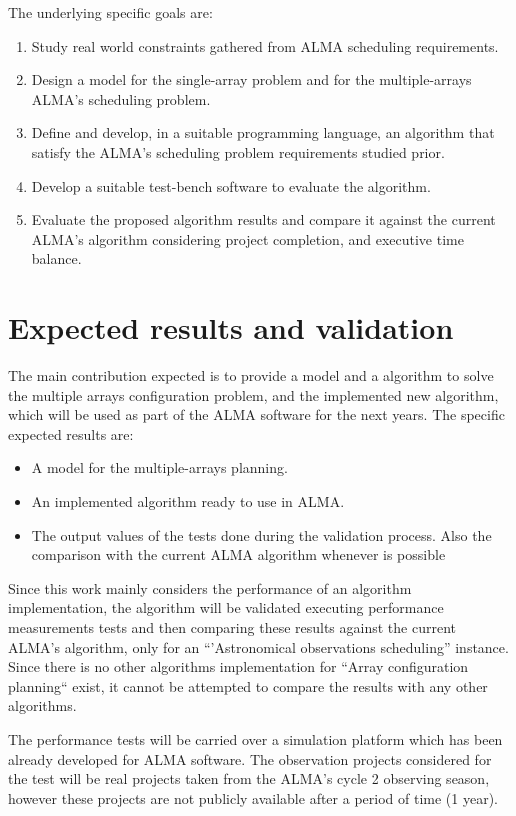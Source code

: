The underlying specific goals are:
\begin{enumerate}
\item Study real world constraints gathered from ALMA scheduling requirements.
\item Design a model for the single-array problem and for the multiple-arrays ALMA’s
scheduling problem.
\item Define and develop, in a suitable programming language, an algorithm that satisfy the ALMA’s scheduling problem requirements
studied prior.
\item Develop a suitable test-bench software to evaluate the algorithm.
\item Evaluate the proposed algorithm results and compare it against the current ALMA's algorithm considering project completion, and executive time balance.
\end{enumerate}

\section{Expected results and validation}
The main contribution expected is to provide a model and a algorithm to solve the multiple arrays configuration problem, and the implemented new algorithm, which will be used as part of the ALMA software for the next years.
The specific expected results are:
\begin{itemize}
\item A model for the multiple-arrays planning.
\item An implemented algorithm ready to use in ALMA.
\item The output values of the tests done during the validation process. Also the comparison with
the current ALMA algorithm whenever is possible
\end{itemize}

Since this work mainly considers the performance of an algorithm implementation, the algorithm will be validated
executing performance measurements tests and then comparing these results against the current ALMA's algorithm, only for an ``'Astronomical observations scheduling'' instance. Since there is no other algorithms implementation for ``Array configuration planning`` exist, it cannot be attempted to compare the results with any other algorithms.

The performance tests will be carried over a simulation platform which has been already
developed for ALMA software. The observation projects considered for the test will be real
projects taken from the ALMA’s cycle 2 observing season, however these projects are not publicly
available after a period of time (1 year).

